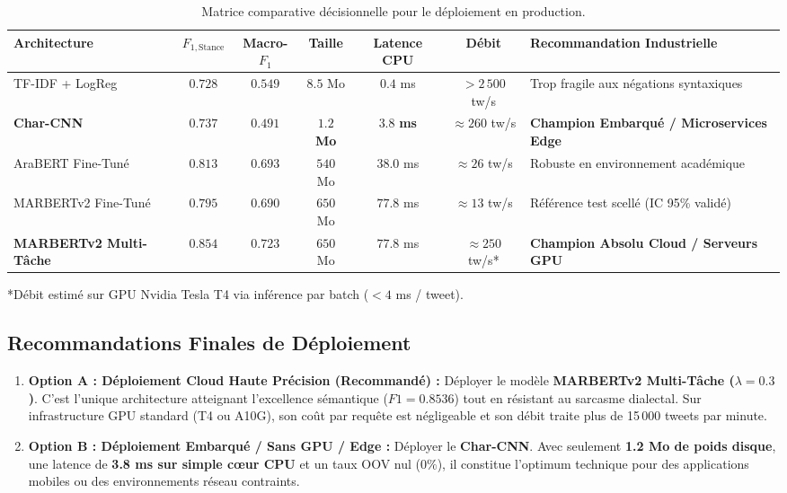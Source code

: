 \documentclass[11pt,a4paper]{article}
\begin{document}
\begin{table}[htbp]
\centering
\caption{Matrice comparative décisionnelle pour le déploiement en production.}
\label{tab:production_matrix}
\begin{tabularx}{\textwidth}{lcccccX}
\toprule
\textbf{Architecture} & \textbf{$F_{1,\text{Stance}}$} & \textbf{Macro-$F_1$} & \textbf{Taille} & \textbf{Latence CPU} & \textbf{Débit} & \textbf{Recommandation Industrielle} \\
\midrule
TF-IDF + LogReg & $0.728$ & $0.549$ & $8.5$ Mo & $\mathbf{0.4}$ ms & $> 2\,500$ tw/s & Trop fragile aux négations syntaxiques \\
\textbf{Char-CNN} & $\mathbf{0.737}$ & $\mathbf{0.491}$ & $\mathbf{1.2}$ \textbf{Mo} & $\mathbf{3.8}$ \textbf{ms} & $\approx 260$ tw/s & \textbf{Champion Embarqué / Microservices Edge} \\
AraBERT Fine-Tuné & $0.813$ & $0.693$ & $540$ Mo & $38.0$ ms & $\approx 26$ tw/s & Robuste en environnement académique \\
MARBERTv2 Fine-Tuné & $0.795$ & $0.690$ & $650$ Mo & $77.8$ ms & $\approx 13$ tw/s & Référence test scellé (IC 95\% validé) \\
\textbf{MARBERTv2 Multi-Tâche} & $\mathbf{0.854}$ & $\mathbf{0.723}$ & $650$ Mo & $77.8$ ms & $\approx 250$ tw/s* & \textbf{Champion Absolu Cloud / Serveurs GPU} \\
\bottomrule
\end{tabularx}
\vspace{0.1cm}
\footnotesize{*Débit estimé sur GPU Nvidia Tesla T4 via inférence par batch ($<4$ ms / tweet).}
\end{table}

\subsection{Recommandations Finales de Déploiement}
\begin{enumerate}
    \item \textbf{Option A : Déploiement Cloud Haute Précision (Recommandé) :}
    Déployer le modèle \textbf{MARBERTv2 Multi-Tâche ($\lambda = 0.3$)}. C'est l'unique architecture atteignant l'excellence sémantique ($F1 = 0.8536$) tout en résistant au sarcasme dialectal. Sur infrastructure GPU standard (T4 ou A10G), son coût par requête est négligeable et son débit traite plus de 15\,000 tweets par minute.
    \item \textbf{Option B : Déploiement Embarqué / Sans GPU / Edge :}
    Déployer le \textbf{Char-CNN}. Avec seulement \textbf{1.2 Mo de poids disque}, une latence de \textbf{3.8 ms sur simple cœur CPU} et un taux OOV nul ($0\%$), il constitue l'optimum technique pour des applications mobiles ou des environnements réseau contraints.
\end{enumerate}
\end{document}
